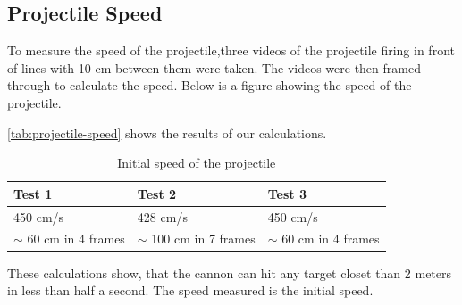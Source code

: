 \subsection{Projectile Speed}
To measure the speed of the projectile,three videos of the projectile firing in front of lines with 10 cm between them were taken. The videos were then framed through to calculate the speed. Below is a figure showing the speed of the projectile.

\autoref{tab:projectile-speed} shows the results of our calculations.

\begin{table}[htbp]
\begin{tabular}{|p{4cm}|p{4cm}|p{4cm}|}
\hline
\textbf{Test 1} & \textbf{Test 2} & \textbf{Test 3} \\
\hline
450 cm/s & 428 cm/s & 450 cm/s\\
\hline
$\sim$ 60 cm in 4 frames & $\sim$ 100 cm in 7 frames & $\sim$ 60 cm in 4 frames \\
\hline
\end{tabular}
\caption{Initial speed of the projectile}
\label{tab:projectile-speed}
\end{table}

These calculations show, that the cannon can hit any target closet than 2 meters in less than half a second. The speed measured is the initial speed.